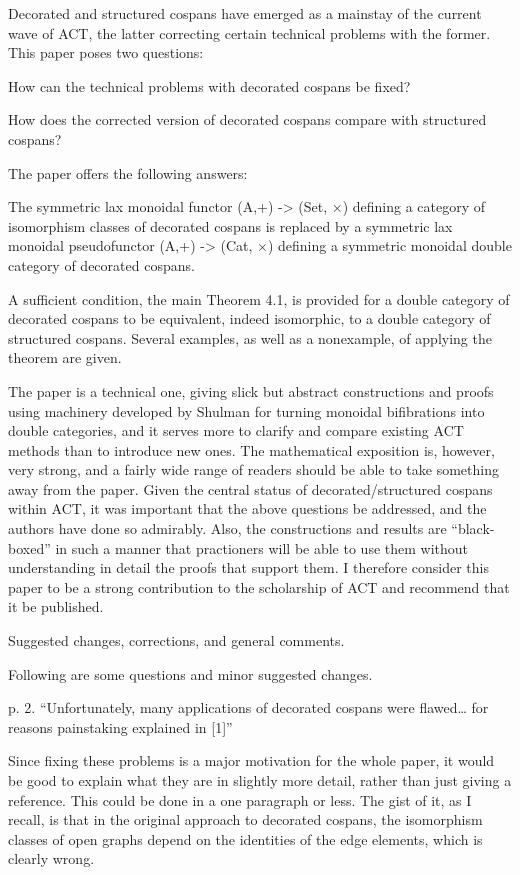 \documentclass[reqno]{amsart}
\begin{document}
{\footnotesize
Decorated and structured cospans have emerged as a mainstay of the current wave of ACT, the latter correcting certain technical problems with the 
former. This paper poses two questions:

    How can the technical problems with decorated cospans be fixed?

    How does the corrected version of decorated cospans compare with structured cospans?

The paper offers the following answers:

The symmetric lax monoidal functor (A,+) -> (Set, $\times$) defining a category of isomorphism classes of decorated cospans is replaced by a 
symmetric lax monoidal pseudofunctor (A,+) -> (Cat, $\times$) defining a symmetric monoidal double category of decorated cospans.

A sufficient condition, the main Theorem 4.1, is provided for a double category of decorated cospans to be equivalent, indeed isomorphic, to a double 
category of structured cospans. Several examples, as well as a nonexample, of applying the theorem are given.

The paper is a technical one, giving slick but abstract constructions and proofs using machinery developed by Shulman for turning monoidal 
bifibrations into double categories, and it serves more to clarify and compare existing ACT methods than to introduce new ones. The mathematical 
exposition is, however, very strong, and a fairly wide range of readers should be able to take something away from the paper. Given the central status 
of decorated/structured cospans within ACT, it was important that the above questions be addressed, and the authors have done so admirably. Also, the 
constructions and results are “black-boxed” in such a manner that practioners will be able to use them without understanding in detail the proofs that 
support them. I therefore consider this paper to be a strong contribution to the scholarship of ACT and recommend that it be published.

Suggested changes, corrections, and general comments.

Following are some questions and minor suggested changes.

p. 2. “Unfortunately, many applications of decorated cospans were flawed… for reasons painstaking explained in [1]”

Since fixing these problems is a major motivation for the whole paper, it would be good to explain what they are in slightly more detail, rather than 
just giving a reference. This could be done in a one paragraph or less. The gist of it, as I recall, is that in the original approach to decorated 
cospans, the isomorphism classes of open graphs depend on the identities of the edge elements, which is clearly wrong.

}
\end{document}
